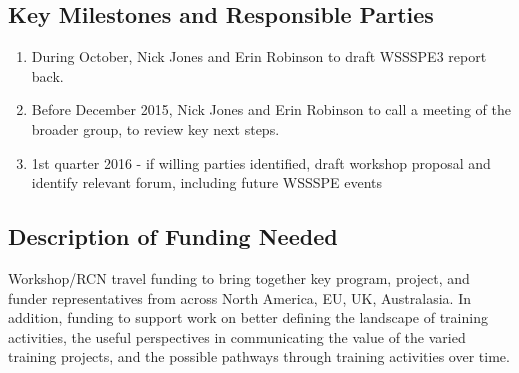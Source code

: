 \subsection{Key Milestones and Responsible Parties}
\begin{enumerate}

\item During October, Nick Jones and Erin Robinson to draft WSSSPE3 report back.

\item Before December 2015, Nick Jones and Erin Robinson to call a meeting of
the broader group, to review key next steps.
    
\item 1st quarter 2016 - if willing parties identified, draft workshop proposal
and identify relevant forum, including future WSSSPE events
    
\end{enumerate}

\subsection{Description of Funding Needed}

Workshop/RCN travel funding to bring together key program, project, and funder
representatives from across North America, EU, UK, Australasia. In addition,
funding to support work on better defining the landscape of training activities,
the useful perspectives in communicating the value of the varied training
projects, and the possible pathways through training activities over time.
